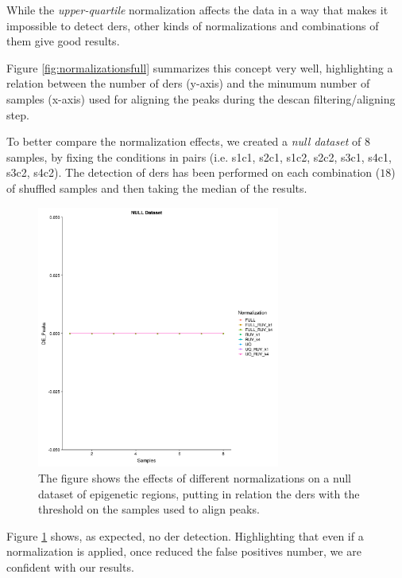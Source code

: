 While the \textit{upper-quartile} normalization affects the data in a way that makes it impossible to detect \glspl{der}, other kinds of normalizations and combinations of them give good results.

Figure \ref{fig:normalizationsfull} summarizes this concept very well, highlighting a relation between the number of \glspl{der} (y-axis) and the minumum number of samples (x-axis) used for aligning the peaks during the \gls{descan} filtering/aligning step.

To better compare the normalization effects, we created a \textit{null dataset} of 8 samples, by fixing the conditions in pairs (i.e. s1c1, s2c1, s1c2, s2c2, s3c1, s4c1, s3c2, s4c2). 
The detection of \glspl{der} has been performed on each combination ($18$) of shuffled samples and then taking the median of the results.

\begin{figure}[H]
\centering
\includegraphics[width=8cm, keepaspectratio]{img/descan2/null_dataset_final.pdf}
\caption[Normalizations applied to null dataset]{The figure shows the effects of different normalizations on a null dataset of epigenetic regions, putting in relation the \glspl{der} with the threshold on the samples used to align peaks.}
\label{fig:normalizationsnull}

\end{figure}

Figure \ref{fig:normalizationsnull} shows, as expected, no \gls{der} detection. 
Highlighting that even if a normalization is applied, once reduced the false positives number, we are confident with our results.


